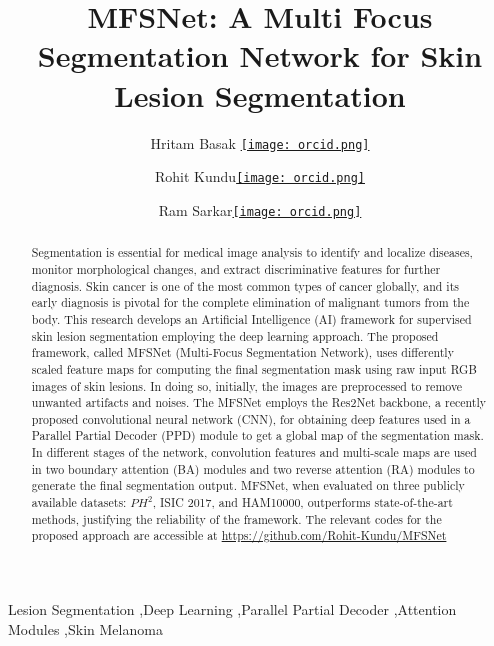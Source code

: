 \documentclass[review]{elsarticle}
\newcommand{\orcid}[1]{\href{https://orcid.org/#1}{\texttt{[image: orcid.png]}}}
\begin{document}
\begin{frontmatter}

\title{MFSNet: A Multi Focus Segmentation Network for Skin Lesion Segmentation}

\author[a]{Hritam Basak \orcid{0000-0001-5921-1230}}
\author[a]{Rohit Kundu\orcid{0000-0001-8665-8898}}
\author[b]{Ram Sarkar\orcid{0000-0001-8813-4086}}

\address[a]{Department of Electrical Engineering, Jadavpur University, INDIA}
\address[b]{Department of Computer Science \& Engineering, Jadavpur University, INDIA}

\begin{abstract} 
Segmentation is essential for medical image analysis to identify and localize diseases, monitor morphological changes, and extract discriminative features for further diagnosis. Skin cancer is one of the most common types of cancer globally, and its early diagnosis is pivotal for the complete elimination of malignant tumors from the body. This research develops an Artificial Intelligence (AI) framework for supervised skin lesion segmentation employing the deep learning approach. The proposed framework, called MFSNet (Multi-Focus Segmentation Network), uses differently scaled feature maps for computing the final segmentation mask using raw input RGB images of skin lesions. In doing so, initially, the images are preprocessed to remove unwanted artifacts and noises. The MFSNet employs the Res2Net backbone, a recently proposed convolutional neural network (CNN), for obtaining deep features used in a Parallel Partial Decoder (PPD) module to get a global map of the segmentation mask. In different stages of the network, convolution features and multi-scale maps are used in two boundary attention (BA) modules and two reverse attention (RA) modules to generate the final segmentation output. MFSNet, when evaluated on three publicly available datasets: $PH^2$, ISIC 2017, and HAM10000, outperforms state-of-the-art methods, justifying the reliability of the framework. The relevant codes for the proposed approach are accessible at \url{https://github.com/Rohit-Kundu/MFSNet}
\end{abstract}

\begin{keyword}
Lesion Segmentation \sep Deep Learning \sep Parallel Partial Decoder \sep Attention Modules \sep Skin Melanoma
\end{keyword}
\end{frontmatter}
\end{document}
